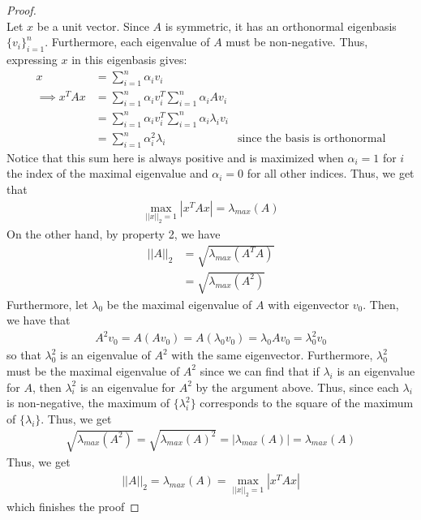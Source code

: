 \documentclass[10pt,a4paper]{article}
\theoremstyle{definition}
\theoremstyle{definition}
\numberwithin{equation}{section}
\begin{document}
\begin{proof}$ $
\\Let $x$ be a unit vector. Since $A$ is symmetric, it has an orthonormal eigenbasis $\{v_i\}_{i = 1}^n$. Furthermore, each eigenvalue of $A$ must be non-negative. Thus, expressing $x$ in this eigenbasis gives:
\begin{align*}
x &= \sum_{i = 1}^n \alpha_i v_i\\
\implies x^T A x &= \sum_{i = 1}^n \alpha_i v_i^T \sum_{i = 1}^n \alpha_i A v_i\\
&= \sum_{i = 1}^n \alpha_i v_i^T \sum_{i = 1}^n \alpha_i \lambda_i v_i\\
&= \sum_{i = 1}^n \alpha_i^2 \lambda_i &\text{since the basis is orthonormal}
\end{align*}
Notice that this sum here is always positive and is maximized when $\alpha_i = 1$ for $i$ the index of the maximal eigenvalue and $\alpha_i = 0$ for all other indices. Thus, we get that 
\begin{align*}
\max_{||x||_2 = 1} |x^T A x| = \lambda_{max}(A)
\end{align*}
On the other hand, by property 2, we have
\begin{align*}
||A||_2 &= \sqrt{\lambda_{max}(A^T A)}\\
&= \sqrt{\lambda_{max}(A^2)}
\end{align*}
Furthermore, let $\lambda_0$ be the maximal eigenvalue of $A$ with eigenvector $v_0$. Then, we have that 
\begin{align*}
A^2 v_0 = A(Av_0) = A(\lambda_0 v_0) = \lambda_0 A v_0 = \lambda_0^2 v_0
\end{align*}
so that $\lambda_0^2$ is an eigenvalue of $A^2$ with the same eigenvector. Furthermore, $\lambda_0^2$ must be the maximal eigenvalue of $A^2$ since we can find that if $\lambda_i$ is an eigenvalue for $A$, then $\lambda_i^2$ is an eigenvalue for $A^2$ by the argument above. Thus, since each $\lambda_i$ is non-negative, the maximum of $\{\lambda_i^2\}$ corresponds to the square of the maximum of $\{\lambda_i\}$. Thus, we get
\begin{align*}
\sqrt{\lambda_{max}(A^2)} = \sqrt{\lambda_{max}(A)^2} = |\lambda_{max}(A)| = \lambda_{max}(A)
\end{align*}
Thus, we get
\begin{align*}
||A||_2 = \lambda_{max}(A) = \max_{||x||_2 = 1} |x^T A x|
\end{align*}
which finishes the proof
\end{proof}
\end{document}
